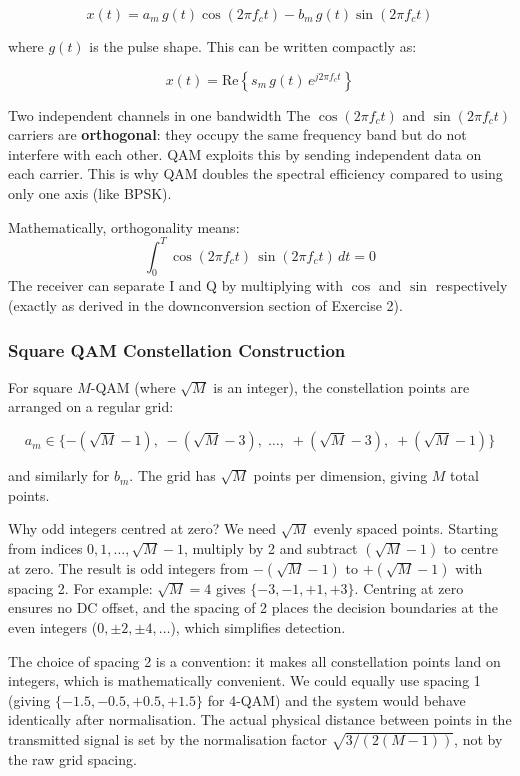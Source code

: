 \begin{equation}
x(t) = a_m\,g(t)\cos(2\pi f_c t) - b_m\,g(t)\sin(2\pi f_c t)
\end{equation}

where $g(t)$ is the pulse shape. This can be written compactly as:

\begin{equation}
x(t) = \text{Re}\!\left\{s_m\,g(t)\,e^{j2\pi f_c t}\right\}
\end{equation}

\begin{KeyBox}{Two independent channels in one bandwidth}
The $\cos(2\pi f_c t)$ and $\sin(2\pi f_c t)$ carriers are \textbf{orthogonal}: they occupy the same frequency band but do not interfere with each other. QAM exploits this by sending independent data on each carrier. This is why QAM doubles the spectral efficiency compared to using only one axis (like BPSK).

Mathematically, orthogonality means:
\begin{equation}
\int_0^T \cos(2\pi f_c t)\,\sin(2\pi f_c t)\,dt = 0
\end{equation}
The receiver can separate I and Q by multiplying with $\cos$ and $\sin$ respectively (exactly as derived in the downconversion section of Exercise 2).
\end{KeyBox}

\subsubsection{Square QAM Constellation Construction}

For square $M$-QAM (where $\sqrt{M}$ is an integer), the constellation points are arranged on a regular grid:

\begin{equation}
a_m \in \{-({\sqrt{M}-1}),\; -({\sqrt{M}-3}),\; \ldots,\; +(\sqrt{M}-3),\; +(\sqrt{M}-1)\}
\end{equation}

and similarly for $b_m$. The grid has $\sqrt{M}$ points per dimension, giving $M$ total points.

\begin{IntuitionBox}{Why odd integers centred at zero?}
We need $\sqrt{M}$ evenly spaced points. Starting from indices $0, 1, \ldots, \sqrt{M}-1$, multiply by 2 and subtract $(\sqrt{M}-1)$ to centre at zero. The result is odd integers from $-(\sqrt{M}-1)$ to $+(\sqrt{M}-1)$ with spacing 2. For example: $\sqrt{M}=4$ gives $\{-3,-1,+1,+3\}$. Centring at zero ensures no DC offset, and the spacing of 2 places the decision boundaries at the even integers ($0, \pm 2, \pm 4, \ldots$), which simplifies detection.

The choice of spacing 2 is a convention: it makes all constellation points land on integers, which is mathematically convenient. We could equally use spacing 1 (giving $\{-1.5, -0.5, +0.5, +1.5\}$ for 4-QAM) and the system would behave identically after normalisation. The actual physical distance between points in the transmitted signal is set by the normalisation factor $\sqrt{3/(2(M-1))}$, not by the raw grid spacing.
\end{IntuitionBox}

